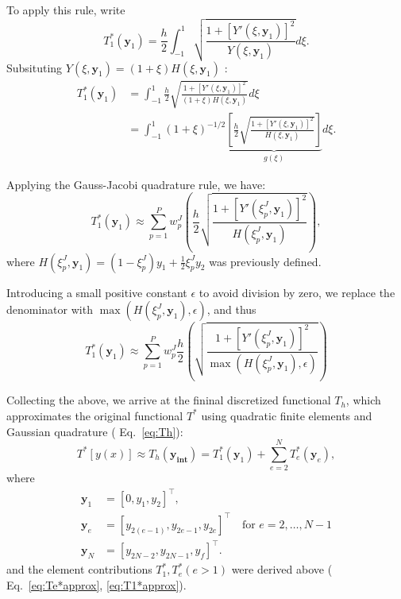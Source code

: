 \documentclass[11pt]{article}
\begin{document}
To apply this rule, write 
\[ 
    T_1^*(\mathbf{y}_1) = \frac{h}{2} \int_{-1}^{1} \sqrt{\frac{1 + [Y'(\xi, \mathbf{y}_1)]^2}{Y(\xi, \mathbf{y}_1)}}  d\xi.
\]
Subsituting \( Y(\xi, \mathbf{y}_1) = (1+\xi) H(\xi, \mathbf{y}_1) \) : 
\begin{align*}
    T_1^*(\mathbf{y}_1) &= \int_{-1}^{1}  \frac{h}{2} \sqrt{\frac{1 + [Y'(\xi, \mathbf{y}_1)]^2}{(1+\xi) H(\xi, \mathbf{y}_1)}} d\xi \\
    &= \int_{-1}^{1} (1+\xi)^{-1/2}  \underbrace{\left[\frac{h}{2}  \sqrt{\frac{1 + [Y'(\xi, \mathbf{y}_1)]^2}{H(\xi, \mathbf{y}_1)}} \right]}_{g(\xi)} d\xi.
\end{align*}

Applying the Gauss-Jacobi quadrature rule, we have:
\[ 
    T_1^*(\mathbf{y}_1) \approx \sum_{p=1}^{P} w_{p}^{J} \left( \frac{h}{2}  \sqrt{\frac{1 + [Y'(\xi_{p}^{J}, \mathbf{y}_1)]^2}{H(\xi_{p}^{J}, \mathbf{y}_1)}} \right),
\] where \( H(\xi_{p}^{J}, \mathbf{y}_1) = (1-\xi_{p}^{J})y_1 + \frac{1}{2}\xi_{p}^{J} y_2 \) was previously defined. 

Introducing a small positive constant \( \epsilon \) to avoid division by zero, we replace the denominator with \( \max(H(\xi_{p}^{J}, \mathbf{y}_1), \epsilon) \), and thus  
\begin{equation}
    T_1^*(\mathbf{y}_1) \approx \sum_{p=1}^{P} w_{p}^{J}  \frac{h}{2} \left( \sqrt{\frac{1 + [Y'(\xi_{p}^{J}, \mathbf{y}_1)]^2}{ \max(H(\xi_{p}^{J}, \mathbf{y}_1), \epsilon) }} \right) \label{eq:T1*approx}
\end{equation}

Collecting the above, we arrive at the fininal discretized functional \( T_h \), which approximates the original functional \( T^{*}  \) using quadratic finite elements and Gaussian quadrature ( Eq.~\eqref{eq:Th}):
\begin{equation} 
    T^*[y(x)] \approx  T_h(\mathbf{y_\text{int}}) = T_1^*(\mathbf{y}_1) + \sum_{e=2}^{N} T_e^*(\mathbf{y}_e), \label{eq:T*approx}
\end{equation}
where  
\begin{align*}
    \mathbf{y}_1 &= [0, y_1, y_2]^\top, \\ 
    \mathbf{y}_e &= [y_{2(e-1)}, y_{2e-1}, y_{2e}]^\top \quad \text{for } e = 2, \ldots, N-1 \\ 
    \mathbf{y}_N &= [y_{2N-2}, y_{2N-1}, y_f]^\top.
\end{align*}
and the element contributions \( T^{*}_1 , T^*_e ( e >1)  \) were derived above ( Eq.~\eqref{eq:Te*approx}, \eqref{eq:T1*approx}). 
\end{document}
